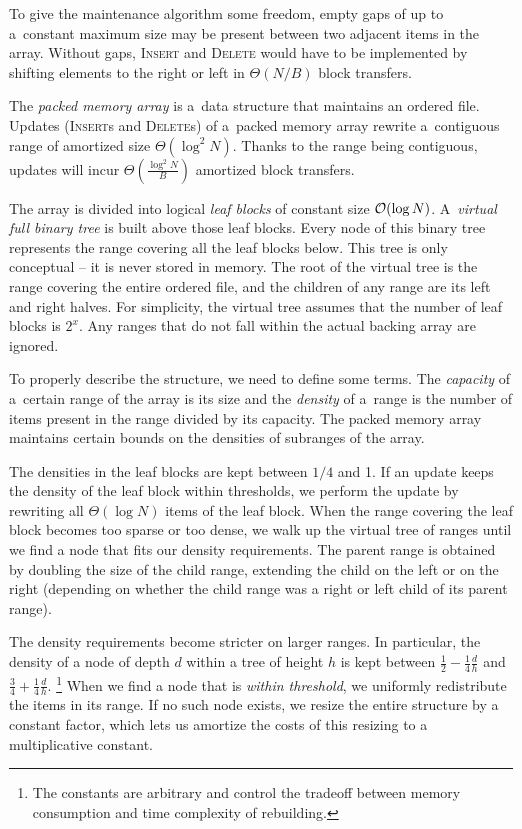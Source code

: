 To give the maintenance algorithm some freedom, empty gaps of up to a~constant
maximum size may be present between two adjacent items in the array. Without
gaps, \textsc{Insert} and \textsc{Delete} would have to be implemented
by shifting elements to the right or left in $\Theta(N/B)$ block transfers.

The \emph{packed memory array} is a~data structure that maintains an ordered
file. Updates (\textsc{Insert}s and \textsc{Delete}s) of a~packed memory array
rewrite a~contiguous range of amortized size $\Theta(\log^2 N)$.
Thanks to the range being contiguous, updates will incur
$\Theta(\frac{\log^2 N}{B})$ amortized block transfers.

The array is divided into logical \emph{leaf blocks} of constant size
$\mathcal{O}(\log N)$. A~\emph{virtual full binary tree} is built above those leaf
blocks. Every node of this binary tree represents the range covering all
the leaf blocks below. This tree is only conceptual -- it is never stored
in memory. The root of the virtual tree is the range covering the entire
ordered file, and the children of any range are its left and right halves.
For simplicity, the virtual tree assumes that the number of leaf blocks
is $2^x$. Any ranges that do not fall within the actual backing array
are ignored.

To properly describe the structure, we need to define some terms. The
\emph{capacity} of a~certain range of the array is its size and the
\emph{density} of a~range is the number of items present in the range divided
by its capacity.
The packed memory array maintains certain bounds on the densities of subranges
of the array.

The densities in the leaf blocks are kept between $1/4$ and 1.
If an update keeps the density of the leaf block within thresholds, we perform
the update by rewriting all $\Theta(\log N)$ items of the leaf block.
When the range covering the leaf block becomes too sparse or too dense, we
walk up the virtual tree of ranges until we find a node that fits our density
requirements. The parent range is obtained by doubling the size of the child
range, extending the child on the left or on the right (depending on
whether the child range was a right or left child of its parent range).

The density requirements become stricter on larger ranges.
In particular, the density of a node of depth $d$ within a tree of height $h$
is kept between $\frac{1}{2}-\frac{1}{4}\frac{d}{h}$ and
$\frac{3}{4}+\frac{1}{4}\frac{d}{h}$.
\footnote{The constants are arbitrary and control the tradeoff
between memory consumption and time complexity of rebuilding.}
When we find a node that is \emph{within threshold}, we uniformly redistribute
the items in its range. If no such node exists, we resize the entire structure
by a constant factor, which lets us amortize the costs of this resizing to
a multiplicative constant.

